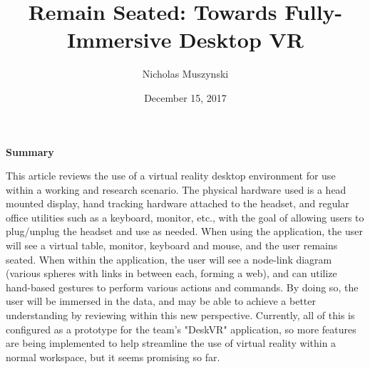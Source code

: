 \documentclass{article}
\begin{document}
\title{Remain Seated: Towards Fully-Immersive Desktop VR}
\author{Nicholas Muszynski}
\date{December 15, 2017}

\maketitle

\textbf{Summary}
\newline

This article reviews the use of a virtual reality desktop environment for use within a working and research scenario. The physical hardware used is a head mounted display, hand tracking hardware attached to the headset, and regular office utilities such as a keyboard, monitor, etc., with the goal of allowing users to plug/unplug the headset and use as needed. When using the application, the user will see a virtual table, monitor, keyboard and mouse, and the user remains seated. When within the application, the user will see a node-link diagram (various spheres with links in between each, forming a web), and can utilize hand-based gestures to perform various actions and commands. By doing so, the user will be immersed in the data, and may be able to achieve a better understanding by reviewing within this new perspective. Currently, all of this is configured as a prototype for the team's "DeskVR" application, so more features are being implemented to help streamline the use of virtual reality within a normal workspace, but it seems promising so far.

\nocite{desktopCite}



\end{document}
